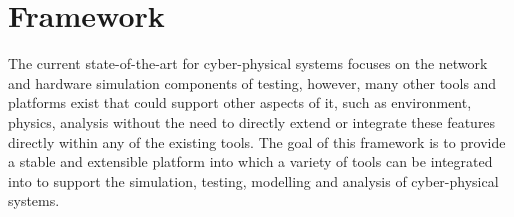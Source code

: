 












\section{Framework}
\label{sec:framework}
The current state-of-the-art for cyber-physical systems focuses on the network and hardware simulation components of testing, however, many other tools and platforms exist that could support other aspects of it, such as environment, physics, analysis without the need to directly extend or integrate these features directly within any of the existing tools. 
The goal of this framework is to provide a stable and extensible platform into which a variety of tools can be integrated into to support the simulation, testing, modelling and analysis of cyber-physical systems.

